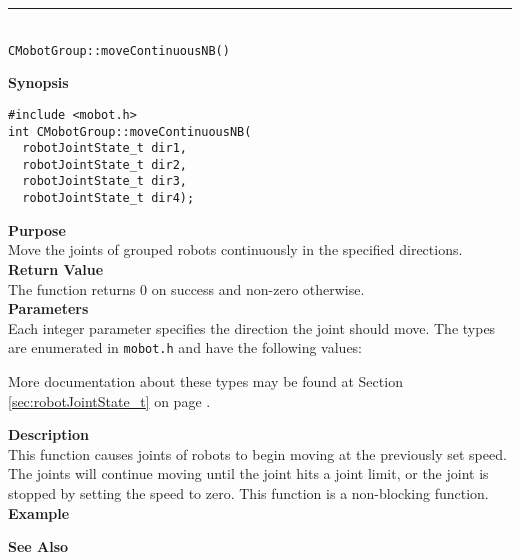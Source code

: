 \noindent
\vspace{5pt}
\rule{4.5in}{0.015in}\\
\noindent
{\LARGE \texttt{CMobotGroup::moveContinuousNB()}}\\
{}

\noindent
{\bf Synopsis}
\vspace{-8pt}
\begin{verbatim}
#include <mobot.h>
int CMobotGroup::moveContinuousNB(
  robotJointState_t dir1, 
  robotJointState_t dir2, 
  robotJointState_t dir3, 
  robotJointState_t dir4);
\end{verbatim}

\noindent
{\bf Purpose}\\
Move the joints of grouped robots continuously in the specified directions.\\

\noindent
{\bf Return Value}\\
The function returns 0 on success and non-zero otherwise.\\

\noindent
{\bf Parameters}\\
Each integer parameter specifies the direction the joint should move. The types
are enumerated in \texttt{mobot.h} and have the following values:

More documentation about these types may be found at Section
\ref{sec:robotJointState_t} on page
\pageref{sec:robotJointState_t}.

\noindent
{\bf Description}\\
This function causes joints of robots to begin moving at the previously set
speed. The joints will continue moving until the joint hits a joint limit, or
the joint is stopped by setting the speed to zero. This function is a non-blocking
function.\\

\noindent
{\bf Example}\\
\noindent

\noindent
{\bf See Also}\\


